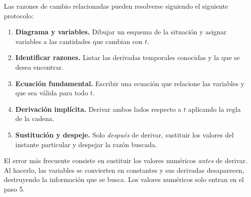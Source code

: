 \begin{pasos} Las razones de cambio relacionadas pueden resolverse siguiendo el siguiente protocolo:
\begin{enumerate}
    \item \textbf{Diagrama y variables.} Dibujar un esquema de la
    situación y asignar variables a las cantidades que cambian con $t$.
    \item \textbf{Identificar razones.} Listar las derivadas temporales
    conocidas y la que se desea encontrar.
    \item \textbf{Ecuación fundamental.} Escribir una ecuación que
    relacione las variables y que sea válida para todo $t$.
    \item \textbf{Derivación implícita.} Derivar ambos lados respecto
    a $t$ aplicando la regla de la cadena.
    \item \textbf{Sustitución y despeje.} Solo \emph{después} de derivar,
    sustituir los valores del instante particular y despejar la razón
    buscada.
\end{enumerate}
\end{pasos}

\begin{rem}
El error más frecuente consiste en sustituir los valores numéricos
\emph{antes} de derivar. Al hacerlo, las variables se convierten en
constantes y sus derivadas desaparecen, destruyendo la información
que se busca. Los valores numéricos solo entran en el paso 5.
\end{rem}

